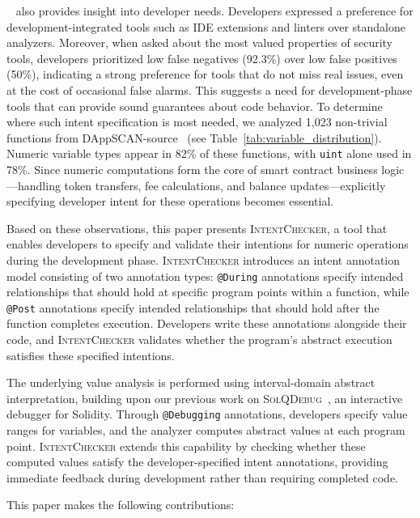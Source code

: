 \documentclass[pdflatex,sn-basic]{sn-jnl}%
\theoremstyle{thmstyleone}%
\theoremstyle{thmstyletwo}%
\theoremstyle{thmstylethree}%
\begin{document}
~\citep{defisecurity} also provides insight into developer needs.
Developers expressed a preference for development-integrated tools such as IDE extensions and linters
over standalone analyzers.
Moreover, when asked about the most valued properties of security tools,
developers prioritized low false negatives (92.3\%) over low false positives (50\%),
indicating a strong preference for tools that do not miss real issues, even at the cost of occasional false alarms.
This suggests a need for development-phase tools that can provide sound guarantees about code behavior.
To determine where such intent specification is most needed,
we analyzed 1,023 non-trivial functions from DAppSCAN-source~\citep{dappscan} (see Table~\ref{tab:variable_distribution}).
Numeric variable types appear in 82\% of these functions, with \texttt{uint} alone used in 78\%.
Since numeric computations form the core of smart contract business logic
---handling token transfers, fee calculations, and balance updates---explicitly specifying developer intent
for these operations becomes essential.

Based on these observations, this paper presents \textsc{IntentChecker},
a tool that enables developers to specify and validate their intentions for numeric operations during the development phase.
\textsc{IntentChecker} introduces an intent annotation model consisting of two annotation types:
\texttt{@During} annotations specify intended relationships that should hold at specific program points within a function,
while \texttt{@Post} annotations specify intended relationships that should hold after the function completes execution.
Developers write these annotations alongside their code, and \textsc{IntentChecker} validates
whether the program's abstract execution satisfies these specified intentions.

The underlying value analysis is performed using interval-domain abstract interpretation,
building upon our previous work on \textsc{SolQDebug}~\citep{solqdebug}, an interactive debugger for Solidity.
Through \texttt{@Debugging} annotations, developers specify value ranges for variables,
and the analyzer computes abstract values at each program point.
\textsc{IntentChecker} extends this capability by checking whether these computed values
satisfy the developer-specified intent annotations,
providing immediate feedback during development rather than requiring completed code.


This paper makes the following contributions:
\end{document}
